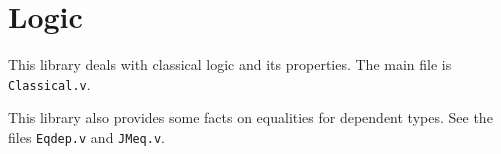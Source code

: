 \section{Logic}\label{Logic}

This library deals with classical logic and its properties.
The main file is {\tt Classical.v}.

This library also provides some facts on equalities for dependent
types. See the files {\tt Eqdep.v} and {\tt JMeq.v}.

